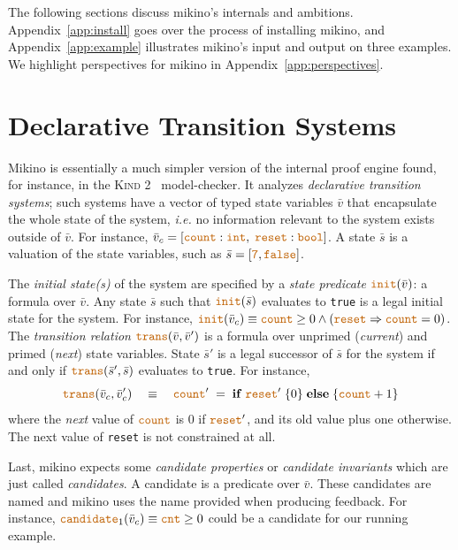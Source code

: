 \documentclass{easychair}
\newcommand{\Mkn}{Mikino}
\newcommand{\mkn}{mikino}
\newcommand{\presecspace}{\vspace{-.3cm}}
\newcommand{\ita}[1]{\textit{#1}}
\newcommand{\mbld}[1]{\mathbf{#1}}
\newcommand{\code}[1]{\textcolor{orange!75!black}{\texttt{#1}}}
\newcommand{\appref}[1]{Appendix~\ref{#1}}
\newcommand{\vars}{\bar{v}}
\newcommand{\state}{\bar{s}}
\newcommand{\tyint}{\code{int}}
\newcommand{\tybool}{\code{bool}}
\newcommand{\init}{\code{init}}
\newcommand{\trans}{\code{trans}}
\newcommand{\cand}{\code{candidate}}
\newcommand{\true}{\code{true}}
\newcommand{\false}{\code{false}}
\newcommand{\num}[1]{\code{#1}}
\newcommand{\impl}{\Rightarrow}
\begin{document}
The following sections discuss \mkn{}'s internals and ambitions. \appref{app:install} goes over the
process of installing \mkn{}, and \appref{app:example} illustrates \mkn{}'s input and output on
three examples. We highlight perspectives for \mkn{} in \appref{app:perspectives}.


\presecspace{}
\section{Declarative Transition Systems}%
\label{sec:input}

\Mkn{} is essentially a much simpler version of the internal proof engine found, for instance, in
the \textsc{Kind} 2~\cite{kind2} model-checker. It analyzes \ita{declarative transition systems};
such systems have a vector of typed state variables \(\vars\) that encapsulate the whole state of
the system, \ita{i.e.} no information relevant to the system exists outside of \(\vars\). For
instance, \(\vars_c = [\code{count}: \tyint,\; \code{reset}: \tybool]\). A state \(\state\) is a
valuation of the state variables, such as \(\state = [\num{7}, \false]\).

The \ita{initial state(s)} of the system are specified by a \ita{state predicate} \(\init(\vars)\):
a formula over \(\vars\). Any state \(\state\) such that \(\init(\state)\) evaluates to \true{} is
a legal initial state for the system. For instance, \(\init(\vars_c) \equiv \code{count} \geq 0
\land (\code{reset} \impl \code{count} = 0)\).
%
The \ita{transition relation} \(\trans(\vars, \vars')\) is a formula over unprimed (\ita{current})
and primed (\ita{next}) state variables. State \(\state'\) is a legal successor of \(\state\) for
the system if and only if \(\trans(\state', \state)\) evaluates to \true{}. For instance, \[
    \trans(\vars_c, \vars'_c) \quad\equiv\quad
    \code{count}' \;=\;
        \mbld{if} \; \code{reset}' \; \{ 0 \} \;
        \mbld{else} \; \{ \code{count} + 1 \}
\]
where the \ita{next} value of \(\code{count}\) is \(0\) if \(\code{reset}'\), and its old value
plus one otherwise. The next value of \code{reset} is not constrained at all.

Last, \mkn{} expects some \ita{candidate properties} or \ita{candidate invariants} which are just
called \ita{candidates}. A candidate is a predicate over \(\vars\). These candidates are named and
\mkn{} uses the name provided when producing feedback. For instance,%
%
\( \cand_1(\vars_c) \equiv \code{cnt} \geq 0 \)
%
could be a candidate for our running example.
\end{document}
